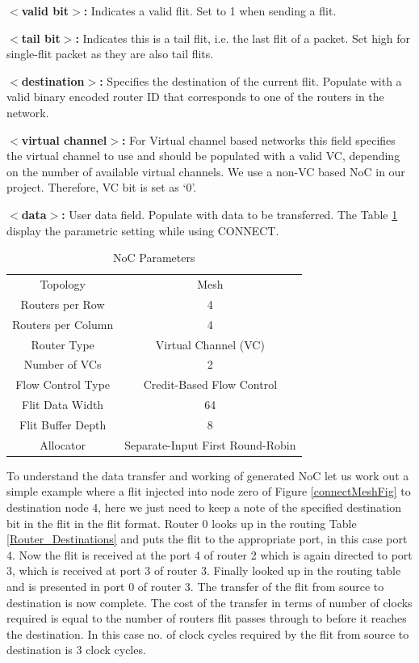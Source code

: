 \textbf{$<$valid bit$>$:} Indicates a valid flit. Set to 1 when sending a flit. \newline

\textbf{$<$tail bit$>$:} Indicates this is a tail flit, i.e. the last flit of a packet. Set high for single-flit packet as they are also tail flits. \newline

\textbf{$<$destination$>$:} Specifies the destination of the current flit. Populate with a valid binary encoded router ID that corresponds to one of the routers in the network. \newline

\textbf{$<$virtual channel$>$:} For Virtual channel based networks this field specifies the virtual channel to use and should be populated with a valid VC, depending on the number of available virtual channels. We use a non-VC based NoC in our project. Therefore, VC bit is set as ‘0’. \newline \

\textbf{$<$data$>$:} User data field. Populate with data to be transferred. \newline \newline
The Table \ref{NoC_parameters} display the parametric setting while using CONNECT. 

\begin{table} [H]
\caption{NoC Parameters}
\centering
\begin{tabular}{||c | c||} 
\hline
	Topology 		& Mesh 				   \\ 
	Routers per Row 	& 4 				   \\
	Routers per Column 	& 4				   \\
	Router Type 		& Virtual Channel (VC) 		   \\
	Number of VCs 		& 2 				   \\
	Flow Control Type 	& Credit-Based Flow Control 	   \\
	Flit Data Width 	& 64 				   \\
	Flit Buffer Depth 	& 8 				   \\
	Allocator 		& Separate-Input First Round-Robin \\
\hline
\end{tabular}
\label{NoC_parameters}
\end{table}

To understand the data transfer and working of generated NoC let us work out a simple example where a flit injected into node zero of Figure \ref{connectMeshFig} to destination node 4, here we just need to keep a note of the specified destination bit in the flit in the flit format. Router 0 looks up in the routing Table \ref{Router_Destinations} and puts the flit to the appropriate port, in this case port 4. Now the flit is received at the port 4 of router 2 which is again directed to port 3, which is received at port 3 of router 3. Finally looked up in the routing table and is presented in port 0 of router 3. The transfer of the flit from source to destination is now complete. The cost of the transfer in terms of number of clocks required is equal to the number of routers flit passes through to before it reaches the destination. In this case no. of clock cycles required by the flit from source to destination is 3 clock cycles.

